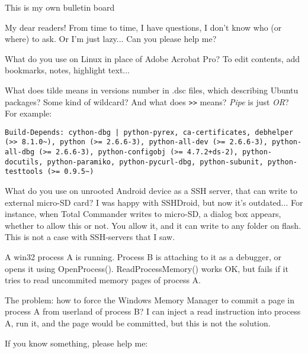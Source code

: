
\begin{center}
\LARGE{} This is my own bulletin board \normalsize{}
\end{center}

My dear readers! From time to time, I have questions, I don't know who (or where) to ask.
Or I'm just lazy...
Can you please help me?

\myhrule{}

What do you use on Linux in place of Adobe Acrobat Pro?
To edit contents, add bookmarks, notes, highlight text...

\myhrule{}

What does tilde means in versions number in .dsc files, which describing Ubuntu packages?
Some kind of wildcard?
And what does \verb|>>| means?
\emph{Pipe} is just \emph{OR}?
For example:

\begin{lstlisting}
Build-Depends: cython-dbg | python-pyrex, ca-certificates, debhelper (>> 8.1.0~), python (>= 2.6.6-3), python-all-dev (>= 2.6.6-3), python-all-dbg (>= 2.6.6-3), python-configobj (>= 4.7.2+ds-2), python-docutils, python-paramiko, python-pycurl-dbg, python-subunit, python-testtools (>= 0.9.5~)
\end{lstlisting}

\myhrule{}

What do you use on unrooted Android device as a SSH server, that can write to external micro-SD card?
I was happy with SSHDroid, but now it's outdated...
For instance, when Total Commander writes to micro-SD, a dialog box appears, whether to allow this or not.
You allow it, and it can write to any folder on flash.
This is not a case with SSH-servers that I saw.

\myhrule{}

A win32 process A is running.
Process B is attaching to it as a debugger, or opens it using OpenProcess().
ReadProcessMemory() works OK, but fails if it tries to read uncommited memory pages of process A.

The problem: how to force the Windows Memory Manager to commit a page in process A from userland of process B?
I can inject a read instruction into process A, run it, and the page would be committed, but this is not the solution.

\myhrule{}

If you know something, please help me: \EMAIL{}

